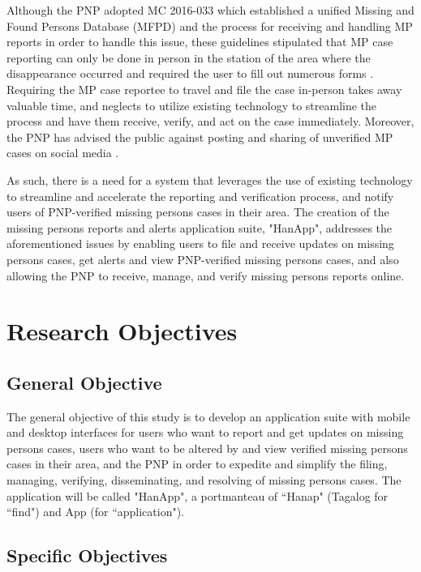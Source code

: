 Although the PNP adopted MC 2016-033 which established a unified Missing and Found Persons Database (MFPD) and the process for receiving and handling MP reports in order to handle this issue, these guidelines stipulated that MP case reporting can only be done in person in the station of the area where the disappearance occurred and required the user to fill out numerous forms \cite{NationalPoliceCommission}. Requiring the MP case reportee to travel and file the case in-person takes away valuable time, and neglects to utilize existing technology to streamline the process and have them receive, verify, and act on the case immediately. Moreover, the PNP has advised the public against posting and sharing of unverified MP cases on social media \cite{madarang_2022}.

As such, there is a need for a system that leverages the use of existing technology to streamline and accelerate the reporting and verification process, and notify users of PNP-verified missing persons cases in their area. The creation of the missing persons reports and alerts application suite, "HanApp", addresses the aforementioned issues by enabling users to file and receive updates on missing persons cases, get alerts and view PNP-verified missing persons cases, and also allowing the PNP to receive, manage, and verify missing persons reports online.

\section{Research Objectives}
\label{sec:researchobjectives}

\subsection{General Objective}
\label{sec:generalobjective}

The general objective of this study is to develop an application suite with mobile and desktop interfaces for users who want to report and get updates on missing persons cases, users who want to be altered by and view verified missing persons cases in their area, and the PNP in order to expedite and simplify the filing, managing, verifying, disseminating, and resolving of missing persons cases. The application will be called "HanApp", a portmanteau of ``Hanap" (Tagalog for ``find") and App (for ``application"). 

\subsection{Specific Objectives}
\label{sec:specificobjectives}


